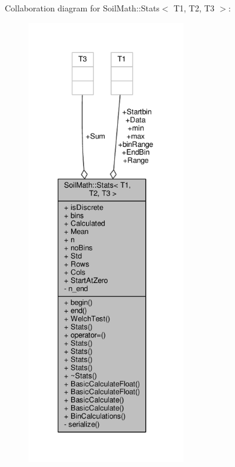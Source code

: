 Collaboration diagram for Soil\+Math\+:\+:Stats$<$ T1, T2, T3 $>$\+:\nopagebreak
\begin{figure}[H]
\begin{center}
\leavevmode
\includegraphics[height=550pt]{class_soil_math_1_1_stats__coll__graph}
\end{center}
\end{figure}
